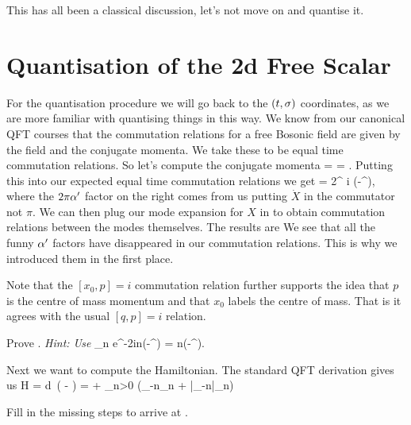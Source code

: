This has all been a classical discussion, let's not move on and quantise it.

\section{Quantisation of the 2d Free Scalar}

For the quantisation procedure we will go back to the $(t,\sigma)$ coordinates, as we are more familiar with quantising things in this way. We know from our canonical QFT courses that the commutation relations for a free Bosonic field are given by the field and the conjugate momenta. We take these to be equal time commutation relations. So let's compute the conjugate momenta
\bse 
    \pi =  =  .
\ese
Putting this into our expected equal time commutation relations we get
 = 2\pi \a^{\prime} i \del(\sig-\sig^{\prime}),
\ese 
where the $2\pi\alpha^{\prime}$ factor on the right comes from us putting $\dot{X}$ in the commutator not $\pi$. We can then plug our mode expansion for $X$ in to obtain commutation relations between the modes themselves. The results are
\noindent We see that all the funny $\alpha^{\prime}$ factors have disappeared in our commutation relations. This is why we introduced them in the first place.

\badr 
    Note that the $[x_0,p]=i$ commutation relation further supports the idea that $p$ is the centre of mass momentum and that $x_0$ labels the centre of mass. That is it agrees with the usual $[q,p]=i$ relation. 
\eadr 

\bbox 
    Prove . \textit{Hint: Use}
    \bse 
        \sum_n e^{-2in(\sig-\sig^{\prime})} = n\del(\sig-\sig^{\prime}).
    \ese 
\ebox 

Next we want to compute the Hamiltonian. The standard QFT derivation gives us 
\be 
\label{eqn:HamiltonianBosonicField}
    H = \int d\sig \, \big( \pi {} - \cL\big) =  + \sum_{n>0} \big(\a_{-n}\a_n + \bar{\a}_{-n}\bar{\a}_n\big)  
\ee 

\bbox 
    Fill in the missing steps to arrive at .
\ebox 

